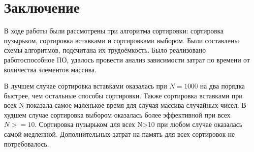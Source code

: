 \chapter{Заключение}

В ходе работы были рассмотрены три алгоритма сортировки: сортировка пузырьком,
сортировка вставками и сортировками выбором.
Были составлены схемы алгоритмов, подсчитана их трудоёмкость.
Было реализовано работоспособное ПО, удалось провести анализ зависимости затрат по времени от количества элементов массива.

В лучшем случае сортировка вставками оказалась при $N = 1000$ на два порядка быстрее, чем остальные способы сортировки.
Также сортировка вставками при всех N показала самое маленькое время для случая массива случайных чисел.
В худшем случае сортировка выбором оказалась более эффективной при всех $N >= 10$.
Сортировка пузырьком для всех N>10 при любом случае оказалась самой медленной.
Дополнительных затрат на память для всех сортировок не потребовалось.

